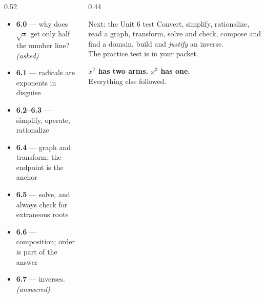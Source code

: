 \documentclass[aspectratio=169, 11pt]{beamer}
\begin{document}
\begin{frame}[t, plain]
  \begin{columns}[T]
    \begin{column}{0.52\textwidth}
      \footnotesize
      \begin{itemize}\setlength{\itemsep}{3pt}
        \item \textbf{6.0} --- why does $\sqrt{x}$ get only half the number line? \emph{(asked)}
        \item \textbf{6.1} --- radicals are exponents in disguise
        \item \textbf{6.2--6.3} --- simplify, operate, rationalize
        \item \textbf{6.4} --- graph and transform; the endpoint is the anchor
        \item \textbf{6.5} --- solve, and always check for extraneous roots
        \item \textbf{6.6} --- composition; order is part of the answer
        \item \textbf{6.7} --- inverses. \emph{(answered)}
      \end{itemize}
    \end{column}
    \begin{column}{0.44\textwidth}
      \footnotesize
      \begin{block}{Next: the Unit 6 test}
        Convert, simplify, rationalize, read a graph, transform, solve and check, compose and find a
        domain, build and \emph{justify} an inverse. \\[4pt]
        The practice test is in your packet.
      \end{block}
      \vspace{4pt}
      \begin{center}
        \textbf{$x^{2}$ has two arms. $x^{3}$ has one.} \\[3pt]
        Everything else followed.
      \end{center}
    \end{column}
  \end{columns}
\end{frame}
\end{document}
